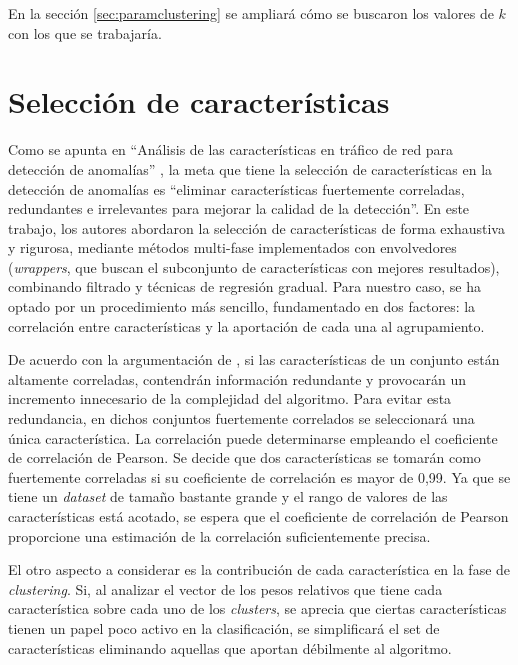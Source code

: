 En la sección \ref{sec:paramclustering} se ampliará cómo se buscaron los valores de $k$ con los que se trabajaría.

\section{Selección de características}\label{sec:selecciondecaracteristicas}

Como se apunta en ``Análisis de las características en tráfico de red para detección de anomalías'' \cite{Iglesias_2015},
la meta que tiene la selección de características en la detección de anomalías es
``eliminar características fuertemente correladas, redundantes e irrelevantes para mejorar la calidad de la detección''.
En este trabajo, los autores abordaron la selección de características de forma exhaustiva y rigurosa,
mediante métodos multi-fase implementados con envolvedores (\emph{wrappers}, que buscan el subconjunto de características con mejores resultados),
combinando filtrado y técnicas de regresión gradual.
Para nuestro caso, se ha optado por un procedimiento más sencillo, fundamentado en dos factores: la correlación entre características y la aportación de cada una al agrupamiento.

De acuerdo con la argumentación de \cite{Bohara_2016}, si las características de un conjunto están altamente correladas,
contendrán información redundante y provocarán un incremento innecesario de la complejidad del algoritmo.
Para evitar esta redundancia, en dichos conjuntos fuertemente correlados se seleccionará una única característica.
La correlación puede determinarse empleando el coeficiente de correlación de Pearson.
Se decide que dos características se tomarán como fuertemente correladas si su coeficiente de correlación es mayor de 0,99.
Ya que se tiene un \emph{dataset} de tamaño bastante grande y el rango de valores de las características está acotado,
se espera que el coeficiente de correlación de Pearson proporcione una estimación de la correlación suficientemente precisa.

El otro aspecto a considerar es la contribución de cada característica en la fase de \emph{clustering}.
Si, al analizar el vector de los pesos relativos que tiene cada característica sobre cada uno de los \emph{clusters},
se aprecia que ciertas características tienen un papel poco activo en la clasificación,
se simplificará el set de características eliminando aquellas que aportan débilmente al algoritmo.

